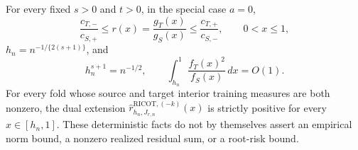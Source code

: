 For every fixed \(s>0\) and \(t>0\), in the special case \(a=0\),
\[
\frac{c_{T,-}}{c_{S,+}}\le r(x)=\frac{g_T(x)}{g_S(x)}\le\frac{c_{T,+}}{c_{S,-}},\qquad 0<x\le1,
\]
\(h_n=n^{-1/\{2(s+1)\}}\), and
\[
h_n^{s+1}=n^{-1/2},\qquad \int_{h_n}^1\frac{f_T(x)^2}{f_S(x)}\,dx=O(1).
\]
For every fold whose source and target interior training measures are both nonzero, the dual extension \(\widehat r^{\mathrm{RICOT},(-k)}_{h_n,J_{r,n}}(x)\) is strictly positive for every \(x\in[h_n,1]\). These deterministic facts do not by themselves assert an empirical norm bound, a nonzero realized residual sum, or a root-risk bound.